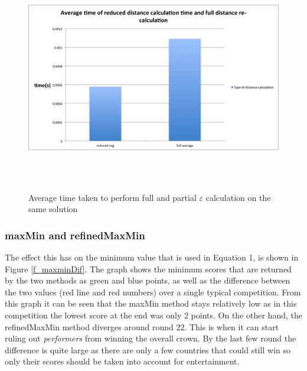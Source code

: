 \documentclass[12pt]{report}
\begin{document}
\begin{figure}[H]
\centering
\includegraphics[width=17cm, height=10cm]{../code/misc/reducedvsFullDistanceCalc}
\caption{Average time taken to perform full and partial $\varepsilon$ calculation on the same solution}
\label{f_recalcComparison}
\end{figure}

\subsubsection{maxMin and refinedMaxMin}
The effect this has on the minimum value that is used in Equation 1, is shown in Figure \ref{f_maxminDif}. The graph shows the minimum scores that are returned by the two methods as green and blue points, as well as the difference between the two values (red line and red numbers) over a single typical competition. From this graph it can be seen that the maxMin method stays relatively low as in this competition the lowest score at the end was only 2 points. On the other hand, the refinedMaxMin method diverges around round 22. This is when it can start ruling out \textit{performers} from winning the overall crown. By the last few round the difference is quite large as there are only a few countries that could still win so only their scores should be taken into account for entertainment.
\end{document}
